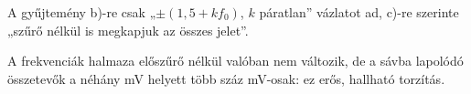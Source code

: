\begin{center}\end{center}
\begin{tipp}
A gyűjtemény b)-re csak „$\pm(1{,}5+kf_0)$, $k$ páratlan” vázlatot ad, c)-re szerinte „szűrő nélkül is megkapjuk az összes jelet”.
\end{tipp}
\begin{figyelem}[Javítás]
A frekvenciák halmaza előszűrő nélkül valóban nem változik, de a sávba lapolódó összetevők a néhány mV helyett több száz mV-osak: ez erős, hallható torzítás.
\end{figyelem}
\begin{eredmeny}

\begin{center}\end{center}

\begin{center}\end{center}
\end{eredmeny}


